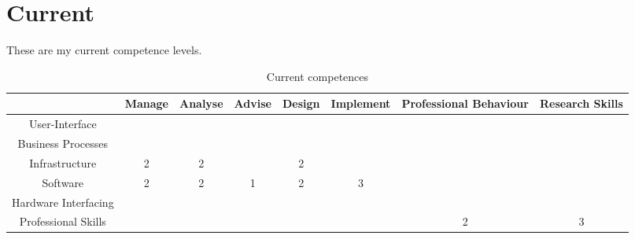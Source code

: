 \section{Current}
These are my current competence levels.

\begin{table}[htb]
	\centering
	\label{my-label}
	\begin{tabular}{|c|c|c|c|c|c|c|c|}
		\hline
		& Manage & Analyse & Advise & Design & Implement & Professional Behaviour & Research Skills \\ \hline
		User-Interface 			& & & & & & & \\ \hline
		Business Processes 		& & & & & & & \\ \hline
		Infrastructure 			&2&2& &2& & & \\ \hline
		Software 				&2&2&1&2&3& & \\ \hline
		Hardware Interfacing 	& & & & & & & \\ \hline
		Professional Skills  	& & & & & &2&3 \\ \hline
	\end{tabular}
	\caption{Current competences}
\end{table}